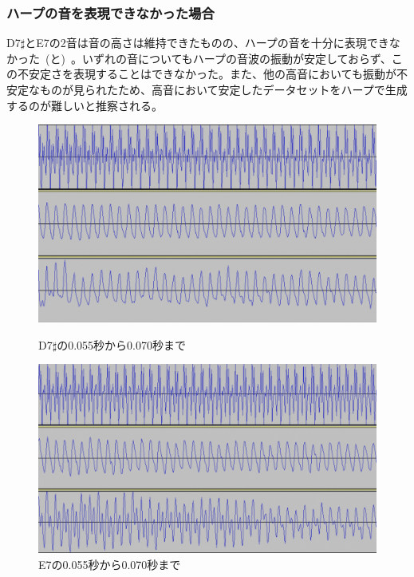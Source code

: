 \clearpage

\subsubsection{ハープの音を表現できなかった場合}

D7$\sharp$とE7の2音は音の高さは維持できたものの、ハープの音を十分に表現できなかった~(と)~。いずれの音についてもハープの音波の振動が安定しておらず、この不安定さを表現することはできなかった。また、他の高音においても振動が不安定なものが見られたため、高音において安定したデータセットをハープで生成するのが難しいと推察される。

\begin{figure}[b]
\centering
\begin{minipage}[b]{0.48\columnwidth}
\centering
\includegraphics[width=0.9\columnwidth]{figure/88_88_det/d7s_0550_0700.png}
\caption[D7$\sharp$の音波]{D7$\sharp$の0.055秒から0.070秒まで}
\label{fig:88_88_bad1}
\end{minipage}
\begin{minipage}[b]{0.48\columnwidth}
\centering
\includegraphics[width=0.9\columnwidth]{figure/88_88_det/e7_0550_0700.png}
\caption[E7の音波]{E7の0.055秒から0.070秒まで}
\label{fig:88_88_bad2}
\end{minipage}
\end{figure}


